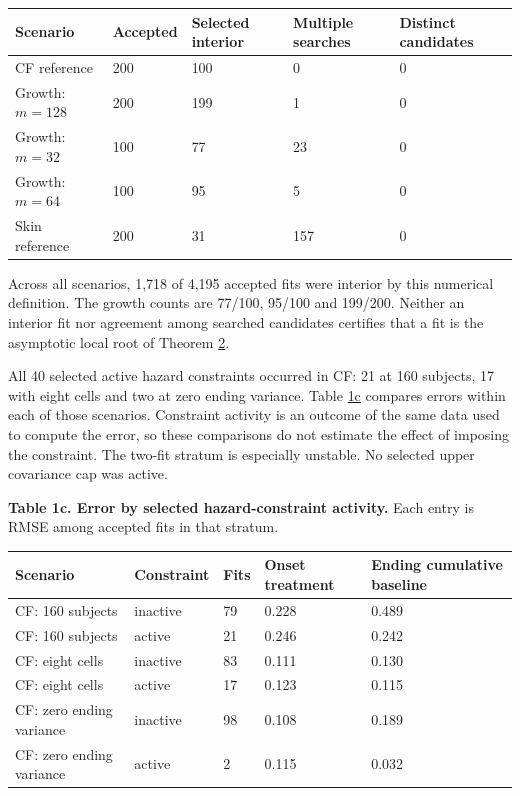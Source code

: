 \documentclass[11pt]{article}
\begin{document}
{\small\setlength{\tabcolsep}{4pt}
\begin{longtable}{lllll}
\toprule
\textbf{Scenario} & \textbf{Accepted} & \textbf{Selected interior} & \textbf{Multiple searches} & \textbf{Distinct candidates} \\
\midrule
\endhead
\bottomrule
\endlastfoot
CF reference & 200 & 100 & 0 & 0 \\
Growth: \(m=128\) & 200 & 199 & 1 & 0 \\
Growth: \(m=32\) & 100 & 77 & 23 & 0 \\
Growth: \(m=64\) & 100 & 95 & 5 & 0 \\
Skin reference & 200 & 31 & 157 & 0 \\
\end{longtable}}

Across all scenarios, 1,718 of 4,195 accepted fits were interior by this numerical definition. The growth counts are 77/100, 95/100 and 199/200. Neither an interior fit nor agreement among searched candidates certifies that a fit is the asymptotic local root of Theorem \hyperref[res:Theorem-2]{2}.

All 40 selected active hazard constraints occurred in CF: 21 at 160 subjects, 17 with eight cells and two at zero ending variance. Table \hyperref[tab:1c]{1c} compares errors within each of those scenarios. Constraint activity is an outcome of the same data used to compute the error, so these comparisons do not estimate the effect of imposing the constraint. The two-fit stratum is especially unstable. No selected upper covariance cap was active.

\label{tab:1c}
\textbf{Table 1c. Error by selected hazard-constraint activity.} Each entry is RMSE among accepted fits in that stratum.

{\footnotesize
\begin{longtable}{lllll}
\toprule
\textbf{Scenario} & \textbf{Constraint} & \textbf{Fits} & \textbf{Onset treatment} & \textbf{Ending cumulative baseline} \\
\midrule
\endhead
\bottomrule
\endlastfoot
CF: 160 subjects & inactive & 79 & 0.228 & 0.489 \\
CF: 160 subjects & active & 21 & 0.246 & 0.242 \\
CF: eight cells & inactive & 83 & 0.111 & 0.130 \\
CF: eight cells & active & 17 & 0.123 & 0.115 \\
CF: zero ending variance & inactive & 98 & 0.108 & 0.189 \\
CF: zero ending variance & active & 2 & 0.115 & 0.032 \\
\end{longtable}}
\end{document}
